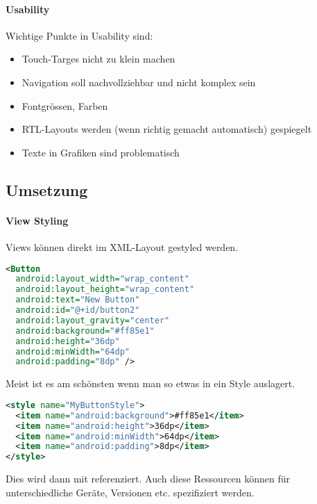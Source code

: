 \paragraph{Usability} Wichtige Punkte in Usability sind:
\begin{itemize}
\item Touch-Targes nicht zu klein machen
\item Navigation soll nachvollziehbar und nicht komplex sein
\item Fontgrössen, Farben
\item RTL-Layouts werden (wenn richtig gemacht automatisch) gespiegelt
\item Texte in Grafiken sind problematisch
\end{itemize}
\subsection{Umsetzung}
\paragraph{View Styling} Views können direkt im XML-Layout gestyled werden. 
\begin{lstlisting}[language=xml]
<Button
  android:layout_width="wrap_content"
  android:layout_height="wrap_content"
  android:text="New Button"
  android:id="@+id/button2"
  android:layout_gravity="center"
  android:background="#ff85e1"
  android:height="36dp"
  android:minWidth="64dp"
  android:padding="8dp" />
\end{lstlisting}
Meist ist es am schönsten wenn man so etwas in ein Style auslagert.
\begin{lstlisting}[language=xml]
<style name="MyButtonStyle">
  <item name="android:background">#ff85e1</item>
  <item name="android:height">36dp</item>
  <item name="android:minWidth">64dp</item>
  <item name="android:padding">8dp</item>
</style>
\end{lstlisting}
Dies wird dann mit  referenziert. Auch diese Ressourcen können für unterschiedliche Geräte, Versionen etc. spezifiziert werden. 
